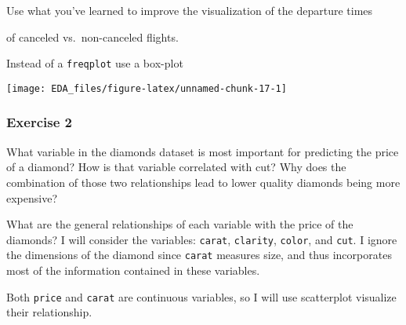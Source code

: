 \documentclass[]{book}
\newenvironment{Shaded}{\begin{snugshade}}{\end{snugshade}}
\newcommand{\DataTypeTok}[1]{\textcolor[rgb]{0.13,0.29,0.53}{#1}}
\newcommand{\DecValTok}[1]{\textcolor[rgb]{0.00,0.00,0.81}{#1}}
\newcommand{\KeywordTok}[1]{\textcolor[rgb]{0.13,0.29,0.53}{\textbf{#1}}}
\newcommand{\NormalTok}[1]{#1}
\newcommand{\OperatorTok}[1]{\textcolor[rgb]{0.81,0.36,0.00}{\textbf{#1}}}
\newcommand{\StringTok}[1]{\textcolor[rgb]{0.31,0.60,0.02}{#1}}
\theoremstyle{plain}
\theoremstyle{remark}
\theoremstyle{definition}
\theoremstyle{definition}
\theoremstyle{definition}
\theoremstyle{remark}
\begin{document}
Use what you've learned to improve the visualization of the departure
times

of canceled vs.~non-canceled flights.

Instead of a \texttt{freqplot} use a box-plot

\begin{Shaded}
\end{Shaded}

\begin{center}\texttt{[image: EDA\_files/figure-latex/unnamed-chunk-17-1]} \end{center}

\hypertarget{exercise-2-14}{%
\subsubsection{Exercise 2}\label{exercise-2-14}}

What variable in the diamonds dataset is most important for predicting
the price of a diamond? How is that variable correlated with cut? Why
does the combination of those two relationships lead to lower quality
diamonds being more expensive?

What are the general relationships of each variable with the price of
the diamonds? I will consider the variables: \texttt{carat},
\texttt{clarity}, \texttt{color}, and \texttt{cut}. I ignore the
dimensions of the diamond since \texttt{carat} measures size, and thus
incorporates most of the information contained in these variables.

Both \texttt{price} and \texttt{carat} are continuous variables, so I
will use scatterplot visualize their relationship.
\end{document}
